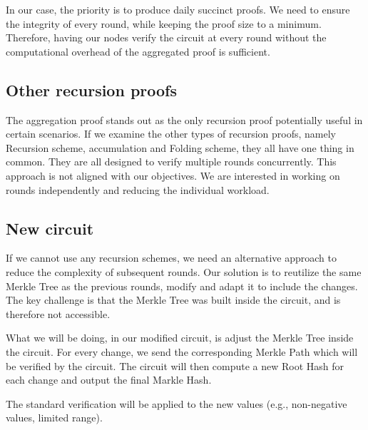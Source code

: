In our case, the priority is to produce daily succinct proofs. We need to ensure the integrity of every round, while keeping the proof size to a minimum.
Therefore, having our nodes verify the circuit at every round without the computational overhead of the aggregated proof is sufficient.

\subsection{Other recursion proofs}
The aggregation proof stands out as the only recursion proof potentially useful in certain scenarios.
If we examine the other types of recursion proofs, namely Recursion scheme, accumulation and Folding scheme, they all have one thing in common.
They are all designed to verify multiple rounds concurrently.
This approach is not aligned with our objectives. We are interested in working on rounds independently and reducing the individual workload.

\subsection{New circuit}
If we cannot use any recursion schemes, we need an alternative approach to reduce the complexity of subsequent rounds.
Our solution is to reutilize the same Merkle Tree as the previous rounds, modify  and adapt it to include the changes.
The key challenge is that the Merkle Tree was built inside the circuit, and is therefore not accessible.

What we will be doing, in our modified circuit, is adjust the Merkle Tree inside the circuit.
For every change, we send the corresponding Merkle Path which will be verified by the circuit.
The circuit will then compute a new Root Hash for each change and output the final Markle Hash.

The standard verification will be applied to the new values (e.g., non-negative values, limited range).

